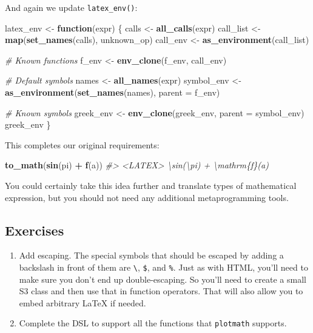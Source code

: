 \documentclass[]{book}
\newenvironment{Shaded}{\begin{snugshade}}{\end{snugshade}}
\newcommand{\CommentTok}[1]{\textcolor[rgb]{0.37,0.37,0.37}{\textit{#1}}}
\newcommand{\ControlFlowTok}[1]{\textcolor[rgb]{0.27,0.27,0.27}{\textbf{#1}}}
\newcommand{\DataTypeTok}[1]{\textcolor[rgb]{0.27,0.27,0.27}{#1}}
\newcommand{\KeywordTok}[1]{\textcolor[rgb]{0.27,0.27,0.27}{\textbf{#1}}}
\newcommand{\NormalTok}[1]{#1}
\newcommand{\OperatorTok}[1]{\textcolor[rgb]{0.43,0.43,0.43}{\textbf{#1}}}
\newcommand{\StringTok}[1]{\textcolor[rgb]{0.5,0.5,0.5}{#1}}
\begin{document}
And again we update \texttt{latex\_env()}:

\begin{Shaded}
\begin{Highlighting}[]
\NormalTok{latex_env <-}\StringTok{ }\ControlFlowTok{function}\NormalTok{(expr) \{}
\NormalTok{  calls <-}\StringTok{ }\KeywordTok{all_calls}\NormalTok{(expr)}
\NormalTok{  call_list <-}\StringTok{ }\KeywordTok{map}\NormalTok{(}\KeywordTok{set_names}\NormalTok{(calls), unknown_op)}
\NormalTok{  call_env <-}\StringTok{ }\KeywordTok{as_environment}\NormalTok{(call_list)}

  \CommentTok{# Known functions}
\NormalTok{  f_env <-}\StringTok{ }\KeywordTok{env_clone}\NormalTok{(f_env, call_env)}

  \CommentTok{# Default symbols}
\NormalTok{  names <-}\StringTok{ }\KeywordTok{all_names}\NormalTok{(expr)}
\NormalTok{  symbol_env <-}\StringTok{ }\KeywordTok{as_environment}\NormalTok{(}\KeywordTok{set_names}\NormalTok{(names), }\DataTypeTok{parent =}\NormalTok{ f_env)}

  \CommentTok{# Known symbols}
\NormalTok{  greek_env <-}\StringTok{ }\KeywordTok{env_clone}\NormalTok{(greek_env, }\DataTypeTok{parent =}\NormalTok{ symbol_env)}
\NormalTok{  greek_env}
\NormalTok{\}}
\end{Highlighting}
\end{Shaded}

This completes our original requirements:

\begin{Shaded}
\begin{Highlighting}[]
\KeywordTok{to_math}\NormalTok{(}\KeywordTok{sin}\NormalTok{(pi) }\OperatorTok{+}\StringTok{ }\KeywordTok{f}\NormalTok{(a))}
\CommentTok{#> <LATEX> \textbackslash{}sin(\textbackslash{}pi) + \textbackslash{}mathrm\{f\}(a)}
\end{Highlighting}
\end{Shaded}

You could certainly take this idea further and translate types of mathematical expression, but you should not need any additional metaprogramming tools.

\hypertarget{exercises-15}{%
\subsection{Exercises}\label{exercises-15}}

\begin{enumerate}
\def\labelenumi{\arabic{enumi}.}
\item
  Add escaping. The special symbols that should be escaped by adding a backslash
  in front of them are \texttt{\textbackslash{}}, \texttt{\$}, and \texttt{\%}. Just as with HTML, you'll need to
  make sure you don't end up double-escaping. So you'll need to create a small
  S3 class and then use that in function operators. That will also allow you
  to embed arbitrary LaTeX if needed.
\item
  Complete the DSL to support all the functions that \texttt{plotmath} supports.
\end{enumerate}
\end{document}
